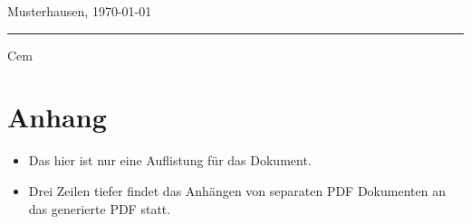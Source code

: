 \documentclass[a4paper, 12pt]{article}
\newcommand{\haAutor}{Cem}
\newcommand{\haAutorOrt}{Musterhausen}
\begin{document}
\vspace{2 cm}

\haAutorOrt, \today

\vspace{1 cm}

\parbox{5cm}{\hrule
\strut \footnotesize \haAutor}


\vfill
\section*{Anhang}
\begin{itemize}
\item Das hier ist nur eine Auflistung für das Dokument.
\item Drei Zeilen tiefer findet das Anhängen von separaten PDF Dokumenten an das generierte PDF statt.
\end{itemize}


\end{document}

